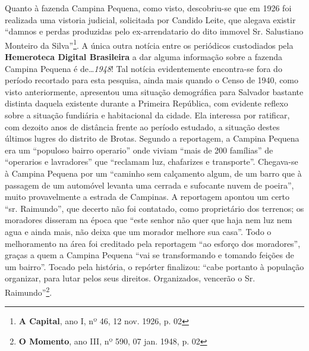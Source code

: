 Quanto à fazenda Campina Pequena, como visto, descobriu-se que em 1926 foi realizada uma vistoria judicial, solicitada por Candido Leite, que alegava existir ``damnos e perdas produzidas pelo ex-arrendatario do dito immovel Sr. Salustiano Monteiro da Silva''\footnote{\textbf{A Capital}, ano I, nº 46, 12 nov. 1926, p. 02}. A única outra notícia entre os periódicos custodiados pela \textbf{Hemeroteca Digital Brasileira} a dar alguma informação sobre a fazenda Campina Pequena é de\dots \textit{1948}! Tal notícia evidentemente encontra-se fora do período recortado para esta pesquisa, ainda mais quando o Censo de 1940, como visto anteriormente, apresentou uma situação demográfica para Salvador bastante distinta daquela existente durante a Primeira República, com evidente reflexo sobre a situação fundiária e habitacional da cidade. Ela interessa por ratificar, com dezoito anos de distância frente ao período estudado, a situação destes últimos lugres do distrito de Brotas. Segundo a reportagem, a Campina Pequena era um ``populoso bairro operario'' onde viviam ``mais de 200 famílias'' de ``operarios e lavradores'' que ``reclamam luz, chafarizes e transporte''. Chegava-se à Campina Pequena por um ``caminho sem calçamento algum, de um barro que à passagem de um automóvel levanta uma cerrada e sufocante nuvem de poeira'', muito provavelmente a estrada de Campinas. A reportagem apontou um certo ``sr. Raimundo'', que decerto não foi contatado, como proprietário dos terrenos; os moradores disseram na época que ``este senhor não quer que haja nem luz nem agua e ainda mais, não deixa que um morador melhore sua casa''. Todo o melhoramento na área foi creditado pela reportagem ``ao esforço dos moradores'', graças a quem a Campina Pequena ``vai se transformando e tomando feições de um bairro''. Tocado pela história, o repórter finalizou: ``cabe portanto à população organizar, para lutar pelos seus direitos. Organizados, vencerão o Sr. Raimundo''\footnote{\textbf{O Momento}, ano III, nº 590, 07 jan. 1948, p. 02}.


